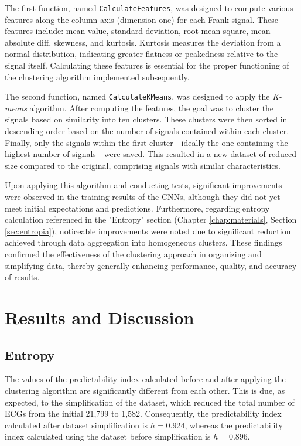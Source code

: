 \documentclass[12pt,english]{report}
\begin{document}
The first function, named \texttt{CalculateFeatures}, was designed to compute various features along the column axis (dimension one) for each Frank signal. These features include: mean value, standard deviation, root mean square, mean absolute diff, skewness, and kurtosis. Kurtosis measures the deviation from a normal distribution, indicating greater flatness or peakedness relative to the signal itself. Calculating these features is essential for the proper functioning of the clustering algorithm implemented subsequently.

The second function, named \texttt{CalculateKMeans}, was designed to apply the \textit{K-means} algorithm. After computing the features, the goal was to cluster the signals based on similarity into ten clusters. These clusters were then sorted in descending order based on the number of signals contained within each cluster. Finally, only the signals within the first cluster—ideally the one containing the highest number of signals—were saved. This resulted in a new dataset of reduced size compared to the original, comprising signals with similar characteristics.

Upon applying this algorithm and conducting tests, significant improvements were observed in the training results of the CNNs, although they did not yet meet initial expectations and predictions. Furthermore, regarding entropy calculation referenced in the "Entropy" section (Chapter \ref{chap:materials}, Section \ref{sec:entropia}), noticeable improvements were noted due to significant reduction achieved through data aggregation into homogeneous clusters. These findings confirmed the effectiveness of the clustering approach in organizing and simplifying data, thereby generally enhancing performance, quality, and accuracy of results.

\chapter{Results and Discussion}
\label{chap:risultati}

\section{Entropy}
\label{sec:entropia_risultati}

The values of the predictability index calculated before and after applying the clustering algorithm are significantly different from each other. This is due, as expected, to the simplification of the dataset, which reduced the total number of ECGs from the initial 21,799 to 1,582. Consequently, the predictability index calculated after dataset simplification is $ h = 0.924 $, whereas the predictability index calculated using the dataset before simplification is $ h = 0.896 $.
\end{document}
